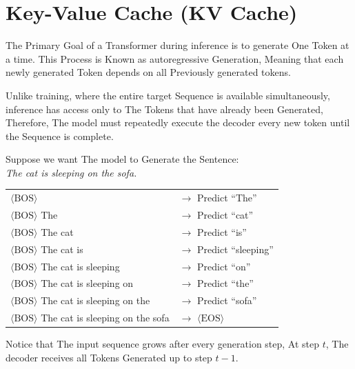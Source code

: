 \section{Key-Value Cache (KV Cache)}

The Primary Goal of a Transformer during inference is to generate One Token at a time. This Process is Known as autoregressive Generation, Meaning that each newly generated Token depends on all Previously generated tokens.

Unlike training, where the entire target Sequence is available simultaneously, inference has access only to The Tokens that have already been Generated, Therefore, The model must repeatedly execute the decoder every new token until the Sequence is complete.

Suppose we want The model to Generate the Sentence: \\


\textit{The cat is sleeping on the sofa.}

\begin{center}
\begin{tabular}{l l}
$\langle \text{BOS} \rangle$
& $\rightarrow$ Predict ``The'' \\[4pt]

$\langle \text{BOS} \rangle$ The
& $\rightarrow$ Predict ``cat'' \\[4pt]

$\langle \text{BOS} \rangle$ The cat
& $\rightarrow$ Predict ``is'' \\[4pt]

$\langle \text{BOS} \rangle$ The cat is
& $\rightarrow$ Predict ``sleeping'' \\[4pt]

$\langle \text{BOS} \rangle$ The cat is sleeping
& $\rightarrow$ Predict ``on'' \\[4pt]

$\langle \text{BOS} \rangle$ The cat is sleeping on
& $\rightarrow$ Predict ``the'' \\[4pt]

$\langle \text{BOS} \rangle$ The cat is sleeping on the
& $\rightarrow$ Predict ``sofa'' \\[4pt]

$\langle \text{BOS} \rangle$ The cat is sleeping on the sofa
& $\rightarrow$ $\langle \text{EOS} \rangle$
\end{tabular}
\end{center}

Notice that The input sequence grows after every generation step, At step $t$, The decoder receives all Tokens Generated up to step $t-1$.


